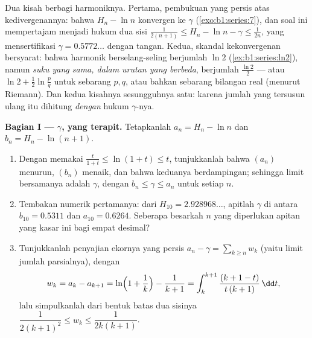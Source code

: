 \begin{problem}[{Soal akhir pekan --- $H_n = \ln n + \gamma +
\frac{1}{2n} + O(n^{-2})$, dan menyusun ulang $1 - \frac12 +
\frac13 - \dots$ menjadi $\frac{\ln 2}{2}$}]
\label{pb:b1:series:1}
Dua kisah berbagi  harmoniknya. Pertama, pembukuan
yang persis atas kedivergenannya: bahwa $H_n - \ln n$ konvergen ke  $\gamma$ (\cref{exo:b1:series:7}), dan soal ini
mempertajam  menjadi hukum dua sisi $\frac{1}{2(n+1)}
\leq H_n - \ln n - \gamma \leq \frac{1}{2n}$, yang mensertifikasi $\gamma
= 0.5772\dots$ dengan tangan. Kedua, skandal kekonvergenan
bersyarat: bahwa  harmonik berselang-seling berjumlah $\ln 2$
(\cref{ex:b1:series:ln2}), namun \emph{suku yang sama, dalam
urutan yang berbeda}, berjumlah $\frac{\ln 2}{2}$ --- atau $\ln 2 +
\frac12\ln\frac pq$ untuk sebarang $p, q$, atau bahkan sebarang bilangan real
(menurut Riemann). Dan kedua kisahnya sesungguhnya satu: karena jumlah yang tersusun ulang itu
dihitung \emph{dengan} hukum $\gamma$-nya.

\medskip
\noindent\textbf{Bagian I --- $\gamma$, yang terapit.} Tetapkanlah $a_n = H_n
- \ln n$ dan $b_n = H_n - \ln(n+1)$.
\begin{enumerate}
  \item Dengan memakai $\frac{t}{1+t} \leq \ln(1 + t) \leq t$, tunjukkanlah bahwa
        $(a_n)$ menurun, $(b_n)$ menaik, dan bahwa keduanya
        berdampingan; sehingga limit bersamanya adalah $\gamma$, dengan $b_n \leq
        \gamma \leq a_n$ untuk setiap $n$.
  \item Tembakan numerik pertamanya: dari $H_{10} = 2.928968\dots$,
        apitlah $\gamma$ di antara $b_{10} = 0.5311$ dan $a_{10} =
        0.6264$. Seberapa besarkah $n$ yang diperlukan apitan yang kasar ini
        bagi empat desimal?
  \item Tunjukkanlah penyajian ekornya yang persis $a_n - \gamma =
        \sum_{k \geq n} w_k$ (yaitu limit jumlah parsialnya), dengan
        \[
        w_k = a_k - a_{k+1}
        = \ln\Bigl(1 + \frac1k\Bigr) - \frac{1}{k+1}
        = \int_k^{k+1} \frac{(k + 1 - t)}{t\,(k+1)}\,\dd t ,
        \]
        lalu simpulkanlah dari bentuk  batas dua sisinya
        $\dfrac{1}{2(k+1)^2} \leq w_k \leq \dfrac{1}{2k(k+1)}$.
\end{enumerate}


\end{problem}
